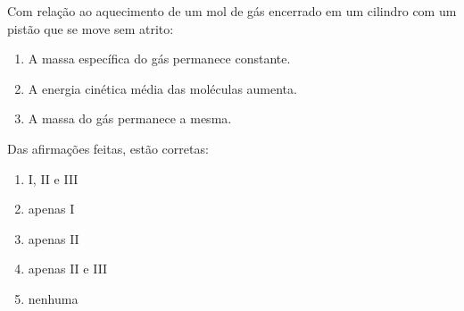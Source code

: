 Com relação ao aquecimento de um mol de gás  encerrado em um cilindro com um pistão que se move sem atrito:

\begin{enumerate}[label = (\Roman*)]
	\item A massa específica do gás permanece constante.
	\item A energia cinética média das moléculas aumenta.
	\item A massa do gás permanece a mesma.
\end{enumerate}

Das afirmações feitas, estão corretas:

\begin{enumerate}[label = (\alph*)]
	\item I, II e III
	\item apenas I
	\item apenas II
	\item apenas II e III
	\item nenhuma
\end{enumerate}
